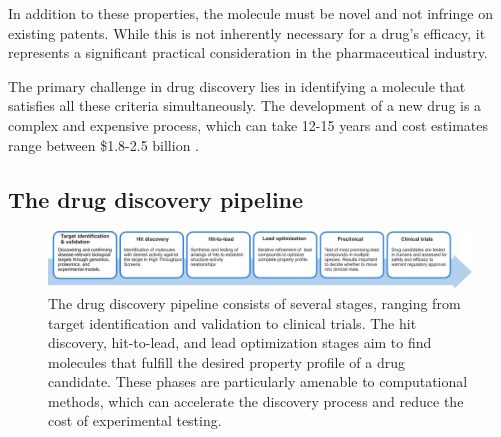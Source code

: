 In addition to these properties, the molecule must be novel and not infringe on existing patents.
While this is not inherently necessary for a drug's efficacy, it represents a significant practical
consideration in the pharmaceutical industry.

The primary challenge in drug discovery lies in identifying a molecule that satisfies all these
criteria simultaneously. The development of a new drug is a complex and expensive process, which can
take 12-15 years and cost estimates range between \$1.8-2.5 billion \citep{hughesPrinciplesEarlyDrug2011,paulHowImproveProductivity2010,dimasiInnovationPharmaceuticalIndustry2016}.

\subsection{The drug discovery pipeline}
\begin{figure}
    \centering
    \includegraphics[width=\textwidth]{figures/drug-discovery-pipeline_v2.pdf}
    \caption{The drug discovery pipeline consists of several stages, ranging from target
        identification and validation to clinical trials. The hit discovery, hit-to-lead, and lead
        optimization stages aim to find molecules that fulfill the desired property profile of a
        drug candidate. These phases are particularly amenable to computational methods, which can
        accelerate the discovery process and reduce the cost of experimental
        testing.\label{fig:drug-discovery-pipeline}}
\end{figure}

